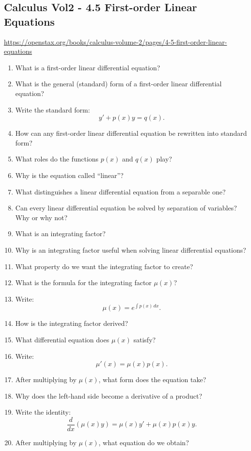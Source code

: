 \subsection{Calculus Vol2 - 4.5 First-order Linear Equations}

\url{https://openstax.org/books/calculus-volume-2/pages/4-5-first-order-linear-equations}

\begin{enumerate}
  \item What is a first-order linear differential equation?
  \item What is the general (standard) form of a first-order linear differential equation?
  \item Write the standard form:
    \[ y' + p(x)y = q(x). \]
  \item How can any first-order linear differential equation be rewritten into standard form?
  \item What roles do the functions \(p(x)\) and \(q(x)\) play?
  \item Why is the equation called ``linear''?
  \item What distinguishes a linear differential equation from a separable one?
  \item Can every linear differential equation be solved by separation of variables? Why or why not?
  \item What is an integrating factor?
  \item Why is an integrating factor useful when solving linear differential equations?
  \item What property do we want the integrating factor to create?
  \item What is the formula for the integrating factor \(\mu(x)\)?
  \item Write:
    \[ \mu(x) = e^{\int p(x)\,dx}. \]
  \item How is the integrating factor derived?
  \item What differential equation does \(\mu(x)\) satisfy?
  \item Write:
    \[ \mu'(x) = \mu(x)p(x). \]
  \item After multiplying by \(\mu(x)\), what form does the equation take?
  \item Why does the left-hand side become a derivative of a product?
  \item Write the identity:
    \[ \frac{d}{dx}(\mu(x)y) = \mu(x)y' + \mu(x)p(x)y. \]
  \item After multiplying by \(\mu(x)\), what equation do we obtain?

\end{enumerate}
